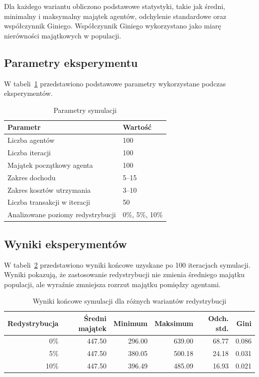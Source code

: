 \documentclass[polish]{projectreport}
\begin{document}
Dla ka{\.z}dego wariantu obliczono podstawowe statystyki, takie jak {\'s}redni,
minimalny i maksymalny maj{\k a}tek agentów, odchylenie standardowe oraz
wspó{\l}czynnik Giniego. Wspó{\l}czynnik Giniego wykorzystano jako miar{\k e}
nierówno{\'s}ci maj{\k a}tkowych w populacji.

\subsection{Parametry eksperymentu}

W tabeli~\ref{tab:parameters} przedstawiono podstawowe parametry wykorzystane
podczas eksperymentów.

\begin{table}[H]
\centering
\caption{Parametry symulacji}
\label{tab:parameters}
\begin{tabular}{ll}
\toprule
Parametr & Warto{\'s}{\'c} \\
\midrule
Liczba agentów & 100 \\
Liczba iteracji & 100 \\
Maj{\k a}tek pocz{\k a}tkowy agenta & 100 \\
Zakres dochodu & 5--15 \\
Zakres kosztów utrzymania & 3--10 \\
Liczba transakcji w iteracji & 50 \\
Analizowane poziomy redystrybucji & 0\%, 5\%, 10\% \\
\bottomrule
\end{tabular}
\end{table}

\subsection{Wyniki eksperymentów}

W tabeli~\ref{tab:results} przedstawiono wyniki ko{\'n}cowe uzyskane po 100
iteracjach symulacji. Wyniki pokazuj{\k a}, {\.z}e zastosowanie redystrybucji nie
zmienia {\'s}redniego maj{\k a}tku populacji, ale wyra{\'z}nie zmniejsza rozrzut
maj{\k a}tku pomi{\k e}dzy agentami.

\begin{table}[H]
\centering
\caption{Wyniki ko{\'n}cowe symulacji dla ró{\.z}nych wariantów redystrybucji}
\label{tab:results}
\begin{tabular}{rrrrrr}
\toprule
Redystrybucja & {\'S}redni maj{\k a}tek & Minimum & Maksimum & Odch. std. & Gini \\
\midrule
0\%  & 447.50 & 296.00 & 639.00 & 68.77 & 0.086 \\
5\%  & 447.50 & 380.05 & 500.18 & 24.18 & 0.031 \\
10\% & 447.50 & 396.49 & 485.09 & 16.93 & 0.021 \\
\bottomrule
\end{tabular}
\end{table}
\end{document}
